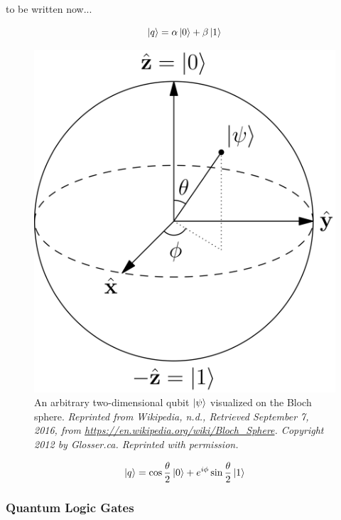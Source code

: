 \documentclass[a4paper]{article}
\begin{document}
to be written now...

\begin{equation}
\label{equ: simplequbit}
\ket{q} = \alpha \ket{0} + \beta \ket{1}
\end{equation}

\begin{figure}[!ht]
	\centering
	\includegraphics[scale=0.07]{blochsphere.png}				\caption{\label{fig:blochsphere} An arbitrary two-dimensional qubit $\ket{\psi}$ visualized on the Bloch sphere. \textit{\small{Reprinted from Wikipedia, n.d., Retrieved September 7, 2016, from \url{https://en.wikipedia.org/wiki/Bloch_Sphere}. Copyright 2012 by Glosser.ca. Reprinted with permission.}}}
\end{figure}

\begin{equation}
\label{equ: blochqubit}
\ket{q} = \cos\frac{\theta}{2} \ket{0} + e^{i \phi} \sin\frac{\theta}{2} \ket{1}
\end{equation}

\subsubsection{Quantum Logic Gates}
\label{subsubsec:quantumlogicgates}
\end{document}
